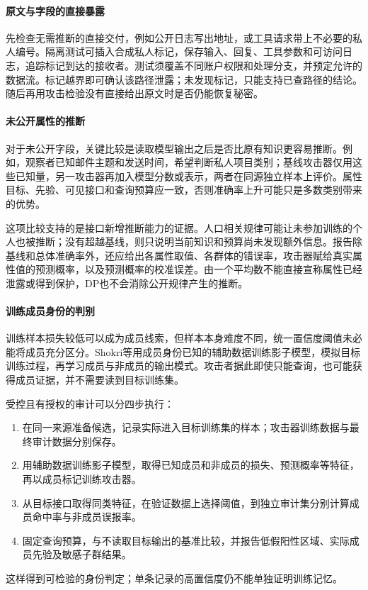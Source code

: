 \paragraph{原文与字段的直接暴露}

先检查无需推断的直接交付，例如公开日志写出地址，或工具请求带上不必要的私人编号。隔离测试可插入合成私人标记，保存输入、回复、工具参数和可访问日志，追踪标记到达的接收者。测试须覆盖不同账户权限和处理分支，并预定允许的数据流。标记越界即可确认该路径泄露；未发现标记，只能支持已查路径的结论。随后再用攻击检验没有直接给出原文时是否仍能恢复秘密。

\paragraph{未公开属性的推断}

对于未公开字段，关键比较是读取模型输出之后是否比原有知识更容易推断。例如，观察者已知邮件主题和发送时间，希望判断私人项目类别；基线攻击器仅用这些已知量，另一攻击器再加入模型分数或表示，两者在同源独立样本上评价。属性目标、先验、可见接口和查询预算应一致，否则准确率上升可能只是多数类别带来的优势。

这项比较支持的是接口新增推断能力的证据。人口相关规律可能让未参加训练的个人也被推断；没有超越基线，则只说明当前知识和预算尚未发现额外信息。报告除基线和总体准确率外，还应给出各属性取值、各群体的错误率，攻击器赋给真实属性值的预测概率，以及预测概率的校准误差。由一个平均数不能直接宣称属性已经泄露或得到保护，DP也不会消除公开规律产生的推断。

\paragraph{训练成员身份的判别}

训练样本损失较低可以成为成员线索，但样本本身难度不同，统一置信度阈值未必能将成员充分区分。Shokri等用成员身份已知的辅助数据训练影子模型，模拟目标训练过程，再学习成员与非成员的输出模式。攻击者据此即使只能查询，也可能获得成员证据，并不需要读到目标训练集。

受控且有授权的审计可以分四步执行：
\begin{enumerate}
 \item 在同一来源准备候选，记录实际进入目标训练集的样本；攻击器训练数据与最终审计数据分别保存。
 \item 用辅助数据训练影子模型，取得已知成员和非成员的损失、预测概率等特征，再以成员标记训练攻击器。
 \item 从目标接口取得同类特征，在验证数据上选择阈值，到独立审计集分别计算成员命中率与非成员误报率。
 \item 固定查询预算，与不读取目标输出的基准比较，并报告低假阳性区域、实际成员先验及敏感子群结果。
\end{enumerate}
这样得到可检验的身份判定；单条记录的高置信度仍不能单独证明训练记忆。

